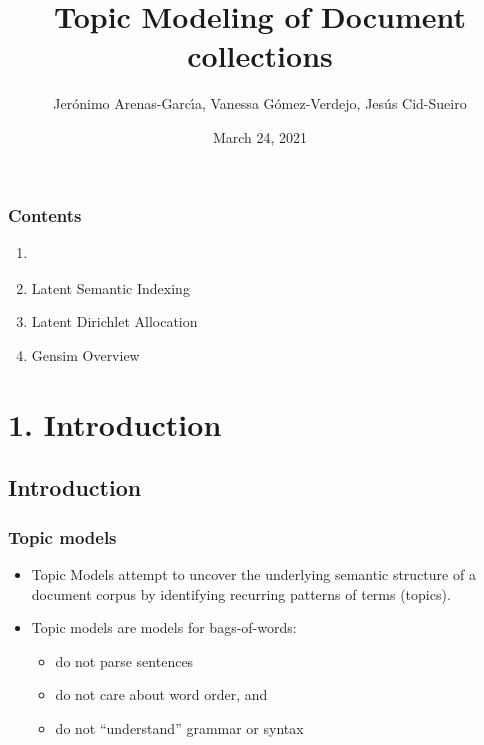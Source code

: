 \documentclass{beamer}
\title[TopicModel]{Topic Modeling of Document collections} %
\author{Jer\'onimo Arenas-Garc\'{\i}a, Vanessa G\'omez-Verdejo, Jes\'us Cid-Sueiro} %
\institute[UC3M] %
{
Universidad Carlos III de Madrid \\ %
\medskip
\textit{jeronimo.arenas@uc3m.es} %
}
\date{March 24, 2021}
\begin{document}
\begin{frame}
\titlepage %
\end{frame}


\begin{frame}

    \frametitle{Contents}

	\large

    \begin{enumerate}
  
    	\item {\bf \color{blue}{Introduction}}
    	\item Latent Semantic Indexing
    	\item Latent Dirichlet Allocation
    	\item Gensim Overview
    
    \end{enumerate}

\end{frame}

\section{1. Introduction}
\subsection{Introduction}

\begin{frame}

    \frametitle{Topic models}

	\large

    \begin{itemize}
  
    	\item Topic Models attempt to uncover the underlying semantic structure of a document corpus by identifying recurring patterns of terms (topics).
    	\vspace{1cm}
    	\item Topic models are models for bags-of-words:
    	\begin{itemize}
			\item do not parse sentences
			\item do not care about word order, and
			\item do not ``understand'' grammar or syntax
		\end{itemize}

    
    \end{itemize}

\end{frame}
\end{document}
